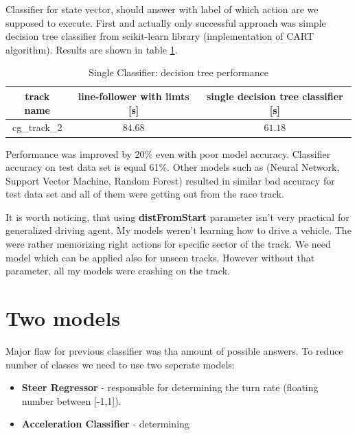 \documentclass[declaration,shortabstract,english,inz]{iithesis}
\begin{document}
Classifier for state vector, should answer with label of which action are we supposed to execute. First and actually only successful approach was  simple decision tree classifier from scikit-learn library (implementation of CART algorithm).  Results are shown in table \ref{tab:single_clp_tree}.


\begin{table}[h]
    \centering
    \begin{tabular}{ |c|c|c|}
          \hline
          track name & line-follower with limts [s] & single decision tree classifier [s] \\
          \hline
          cg\_track\_2 & $84.68$ & $61.18$ \\
          \hline
        \end{tabular}
        \caption{Single Classifier: decision tree performance}
        \label{tab:single_clp_tree}

\end{table}

Performance was improved by 20\% even with poor model accuracy. Classifier accuracy on test data set is equal 61\%. Other models such as (Neural Network, Support Vector Machine, Random Forest) resulted in similar bad accuracy for test data set and all of them were getting out from the race track.   

It is worth noticing, that using \textbf{distFromStart} parameter isn't very practical for generalized driving agent. My models weren't learning how to drive a vehicle. The were rather memorizing right actions for specific sector of the track. We need model which can be applied also for unseen tracks. However without that parameter, all my models were crashing on the track.

\section{Two models}

Major flaw for previous classifier was tha amount of possible answers. To reduce number of classes we need to use two seperate models: 

\begin{itemize}
    \item \textbf{Steer Regressor} - responsible for determining the turn rate (floating number between [-1,1]).
    \item \textbf{Acceleration Classifier} - determining
\end{itemize}
\end{document}
